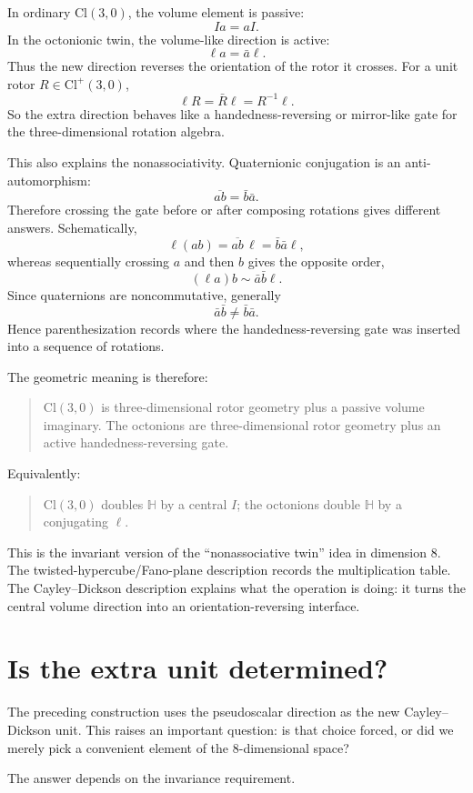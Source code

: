 \documentclass[11pt]{article}
\newcommand{\Cl}{\mathrm{Cl}}
\begin{document}
In ordinary $\Cl(3,0)$, the volume element is passive:
\[
Ia=aI.
\]
In the octonionic twin, the volume-like direction is active:
\[
\ell a=\bar a\ell.
\]
Thus the new direction reverses the orientation of the rotor it crosses. For a
unit rotor $R\in\Cl^+(3,0)$,
\[
\ell R=\bar R\ell=R^{-1}\ell.
\]
So the extra direction behaves like a handedness-reversing or mirror-like gate
for the three-dimensional rotation algebra.

This also explains the nonassociativity. Quaternionic conjugation is an
anti-automorphism:
\[
\overline{ab}=\bar b\bar a.
\]
Therefore crossing the gate before or after composing rotations gives different
answers. Schematically,
\[
\ell(ab)=\overline{ab}\,\ell=\bar b\bar a\ell,
\]
whereas sequentially crossing $a$ and then $b$ gives the opposite order,
\[
(\ell a)b\sim \bar a\bar b\ell.
\]
Since quaternions are noncommutative, generally
\[
\bar a\bar b\neq \bar b\bar a.
\]
Hence parenthesization records where the handedness-reversing gate was inserted into
a sequence of rotations.

The geometric meaning is therefore:
\begin{quote}
$\Cl(3,0)$ is three-dimensional rotor geometry plus a passive volume imaginary.
The octonions are three-dimensional rotor geometry plus an active
handedness-reversing gate.
\end{quote}

Equivalently:
\begin{quote}
$\Cl(3,0)$ doubles $\mathbb H$ by a central $I$; the octonions double
$\mathbb H$ by a conjugating $\ell$.
\end{quote}

This is the invariant version of the ``nonassociative twin'' idea in dimension
$8$. The twisted-hypercube/Fano-plane description records the multiplication
table. The Cayley--Dickson description explains what the operation is doing:
it turns the central volume direction into an orientation-reversing interface.


\section{Is the extra unit determined?}

The preceding construction uses the pseudoscalar direction as the new
Cayley--Dickson unit. This raises an important question: is that choice forced,
or did we merely pick a convenient element of the $8$-dimensional space?

The answer depends on the invariance requirement.
\end{document}
